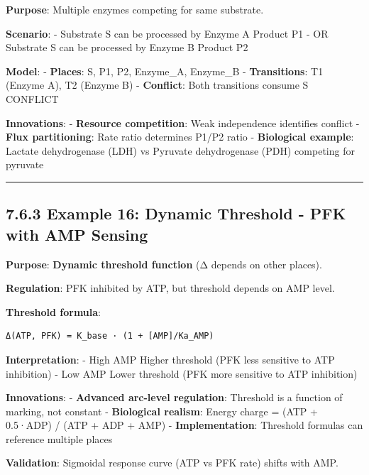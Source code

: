 \textbf{Purpose}: Multiple enzymes competing for same substrate.

\textbf{Scenario}: - Substrate S can be processed by Enzyme A \textrightarrow Product
P1 - OR Substrate S can be processed by Enzyme B \textrightarrow Product P2

\textbf{Model}: - \textbf{Places}: S, P1, P2, Enzyme\_A, Enzyme\_B -
\textbf{Transitions}: T1 (Enzyme A), T2 (Enzyme B) - \textbf{Conflict}:
Both transitions consume S \textrightarrow CONFLICT

\textbf{Innovations}: - \textbf{Resource competition}: Weak independence
identifies conflict - \textbf{Flux partitioning}: Rate ratio determines
P1/P2 ratio - \textbf{Biological example}: Lactate dehydrogenase (LDH)
vs Pyruvate dehydrogenase (PDH) competing for pyruvate

\begin{center}\rule{0.5\linewidth}{0.5pt}\end{center}

\hypertarget{example-16-dynamic-threshold---pfk-with-amp-sensing}{%
\subsection{7.6.3 Example 16: Dynamic Threshold - PFK with AMP
Sensing}\label{example-16-dynamic-threshold---pfk-with-amp-sensing}}

\textbf{Purpose}: \textbf{Dynamic threshold function} (Δ depends on
other places).

\textbf{Regulation}: PFK inhibited by ATP, but threshold depends on AMP
level.

\textbf{Threshold formula}:

\begin{lstlisting}
Δ(ATP, PFK) = K_base · (1 + [AMP]/Ka_AMP)
\end{lstlisting}

\textbf{Interpretation}: - High AMP \textrightarrow Higher threshold (PFK less
sensitive to ATP inhibition) - Low AMP \textrightarrow Lower threshold (PFK more
sensitive to ATP inhibition)

\textbf{Innovations}: - \checkmark \textbf{Advanced arc-level regulation}:
Threshold is a function of marking, not constant - \textbf{Biological
realism}: Energy charge = (ATP + 0.5·ADP) / (ATP + ADP + AMP) -
\textbf{Implementation}: Threshold formulas can reference multiple
places

\textbf{Validation}: Sigmoidal response curve (ATP vs PFK rate) shifts
with AMP.

